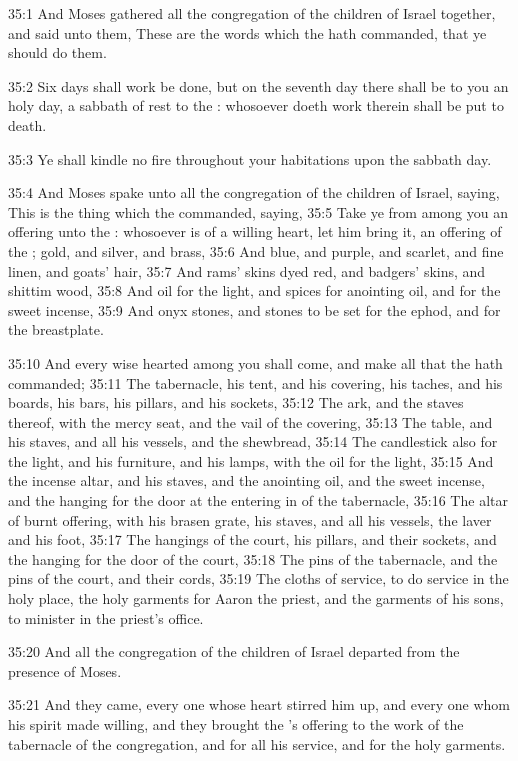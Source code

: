 35:1 And Moses gathered all the congregation of the children of Israel
together, and said unto them, These are the words which the \LORD hath
commanded, that ye should do them.

35:2 Six days shall work be done, but on the seventh day there shall
be to you an holy day, a sabbath of rest to the \LORD: whosoever doeth
work therein shall be put to death.

35:3 Ye shall kindle no fire throughout your habitations upon the
sabbath day.

35:4 And Moses spake unto all the congregation of the children of
Israel, saying, This is the thing which the \LORD commanded, saying,
35:5 Take ye from among you an offering unto the \LORD: whosoever is of
a willing heart, let him bring it, an offering of the \LORD; gold, and
silver, and brass, 35:6 And blue, and purple, and scarlet, and fine
linen, and goats' hair, 35:7 And rams' skins dyed red, and badgers'
skins, and shittim wood, 35:8 And oil for the light, and spices for
anointing oil, and for the sweet incense, 35:9 And onyx stones, and
stones to be set for the ephod, and for the breastplate.

35:10 And every wise hearted among you shall come, and make all that
the \LORD hath commanded; 35:11 The tabernacle, his tent, and his
covering, his taches, and his boards, his bars, his pillars, and his
sockets, 35:12 The ark, and the staves thereof, with the mercy seat,
and the vail of the covering, 35:13 The table, and his staves, and all
his vessels, and the shewbread, 35:14 The candlestick also for the
light, and his furniture, and his lamps, with the oil for the light,
35:15 And the incense altar, and his staves, and the anointing oil,
and the sweet incense, and the hanging for the door at the entering in
of the tabernacle, 35:16 The altar of burnt offering, with his brasen
grate, his staves, and all his vessels, the laver and his foot, 35:17
The hangings of the court, his pillars, and their sockets, and the
hanging for the door of the court, 35:18 The pins of the tabernacle,
and the pins of the court, and their cords, 35:19 The cloths of
service, to do service in the holy place, the holy garments for Aaron
the priest, and the garments of his sons, to minister in the priest's
office.

35:20 And all the congregation of the children of Israel departed from
the presence of Moses.

35:21 And they came, every one whose heart stirred him up, and every
one whom his spirit made willing, and they brought the \LORD's offering
to the work of the tabernacle of the congregation, and for all his
service, and for the holy garments.


